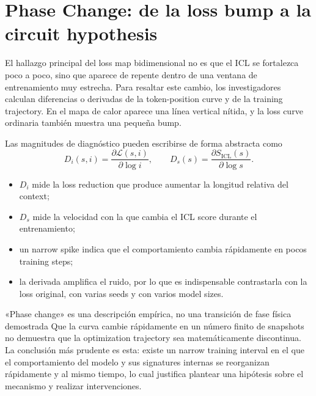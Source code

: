 \section{Phase Change: de la loss bump a la circuit hypothesis}

El hallazgo principal del loss map bidimensional no es que el ICL se fortalezca poco a poco, sino que aparece de repente dentro de una ventana de entrenamiento muy estrecha. Para resaltar este cambio, los investigadores calculan diferencias o derivadas de la token-position curve y de la training trajectory. En el mapa de calor aparece una línea vertical nítida, y la loss curve ordinaria también muestra una pequeña bump.


Las magnitudes de diagnóstico pueden escribirse de forma abstracta como
\[
D_i(s,i)=\frac{\partial \mathcal{L}(s,i)}{\partial \log i},
\qquad
D_s(s)=\frac{\partial S_{\mathrm{ICL}}(s)}{\partial \log s}.
\]

\begin{itemize}
  \item $D_i$ mide la loss reduction que produce aumentar la longitud relativa del context;
  \item $D_s$ mide la velocidad con la que cambia el ICL score durante el entrenamiento;
  \item un narrow spike indica que el comportamiento cambia rápidamente en pocos training steps;
  \item la derivada amplifica el ruido, por lo que es indispensable contrastarla con la loss original, con varias seeds y con varios model sizes.
\end{itemize}


\begin{warningbox}{«Phase change» es una descripción empírica, no una transición de fase física demostrada}
Que la curva cambie rápidamente en un número finito de snapshots no demuestra que la optimization trajectory sea matemáticamente discontinua. La conclusión más prudente es esta: existe un narrow training interval en el que el comportamiento del modelo y sus signatures internas se reorganizan rápidamente y al mismo tiempo, lo cual justifica plantear una hipótesis sobre el mecanismo y realizar intervenciones.
\end{warningbox}

